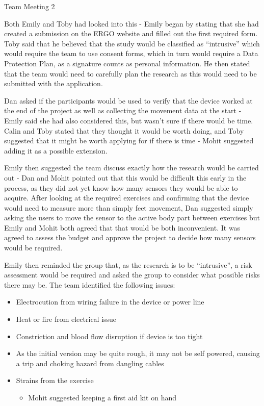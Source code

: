 \documentclass{article}
\begin{document}
\begin{Minutes}{Team Meeting 2}

Both Emily and Toby had looked into this - Emily began by stating that she had created a submission on
the ERGO website and filled out the first required form. Toby said that he believed that the study
would be classified as ``intrusive'' which would require the team to use consent forms, which in turn
would require a Data Protection Plan, as a signature counts as personal information. He then stated that
the team would need to carefully plan the research as this would need to be submitted with the application.

Dan asked if the participants would be used to verify that the device worked at the end of the project as
well as collecting the movement data at the start - Emily said she had also considered this, but wasn't
sure if there would be time. Calin and Toby stated that they thought it would be worth doing, and Toby
suggested that it might be worth applying for if there is time - Mohit suggested adding it as a possible
extension.

Emily then suggested the team discuss exactly how the research would be carried out - Dan and Mohit pointed
out that this would be difficult this early in the process, as they did not yet know how many sensors they
would be able to acquire. After looking at the required exercises and confirming that the device would need
to measure more than simply feet movement, Dan suggested simply asking the users to move the sensor to the
active body part between exercises but Emily and Mohit both agreed that that would be both inconvenient. It
was agreed to assess the budget and approve the project to decide how many sensors would be required.

Emily then reminded the group that, as the research is to be ``intrusive'', a risk assessment would be
required and asked the group to consider what possible risks there may be. The team identified the following
issues:

\begin{itemize}
	\item Electrocution from wiring failure in the device or power line
	\item Heat or fire from electrical issue
	\item Constriction and blood flow disruption if device is too tight
	\item As the initial version may be quite rough, it may not be self powered, causing a trip and choking hazard from dangling cables
	\item Strains from the exercise
		\begin{itemize}
			\item Mohit suggested keeping a first aid kit on hand
		\end{itemize}
\end{itemize}


\end{Minutes}
\end{document}
